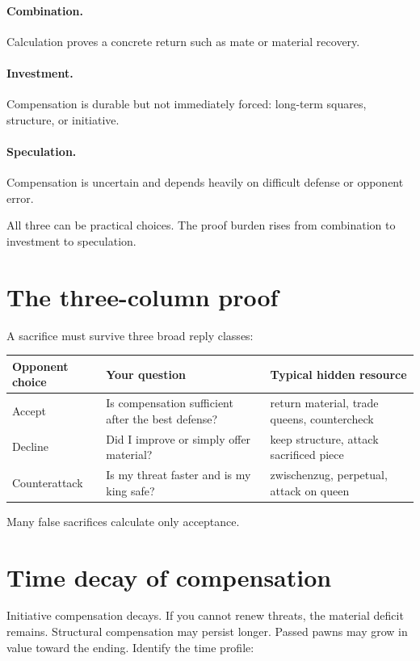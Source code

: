 \paragraph{Combination.} Calculation proves a concrete return such as mate or material recovery.

\paragraph{Investment.} Compensation is durable but not immediately forced: long-term squares, structure, or initiative.

\paragraph{Speculation.} Compensation is uncertain and depends heavily on difficult defense or opponent error.

All three can be practical choices. The proof burden rises from combination to investment to speculation.

\section{The three-column proof}
A sacrifice must survive three broad reply classes:

\begin{center}
\begin{tabularx}{.94\textwidth}{p{}YY}
\toprule
\textbf{Opponent choice} & \textbf{Your question} & \textbf{Typical hidden resource}\\
\midrule
Accept & Is compensation sufficient after the best defense? & return material, trade queens, countercheck\\
Decline & Did I improve or simply offer material? & keep structure, attack sacrificed piece\\
Counterattack & Is my threat faster and is my king safe? & zwischenzug, perpetual, attack on queen\\
\bottomrule
\end{tabularx}
\end{center}

Many false sacrifices calculate only acceptance.

\section{Time decay of compensation}
Initiative compensation decays. If you cannot renew threats, the material deficit remains. Structural compensation may persist longer. Passed pawns may grow in value toward the ending. Identify the time profile:


